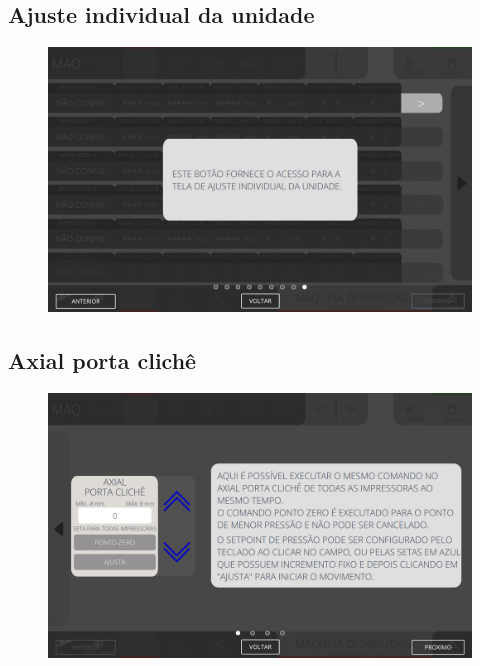 \subsection{Ajuste individual da unidade}
\begin{figure}
    \centering
    \includegraphics[width=576 px,height=360 px]{src/imagesICV/04-printters/01-printters/settings/9.png}
\end{figure}
\newpage
\thispagestyle{fancy}
\vspace{\fill}

\subsection{Axial porta clichê}
\begin{figure}
    \centering
    \includegraphics[width=576 px,height=360 px]{src/imagesICV/04-printters/01-printters/settings/10.png}
\end{figure}
\newpage
\thispagestyle{fancy}
\vspace{\fill}

